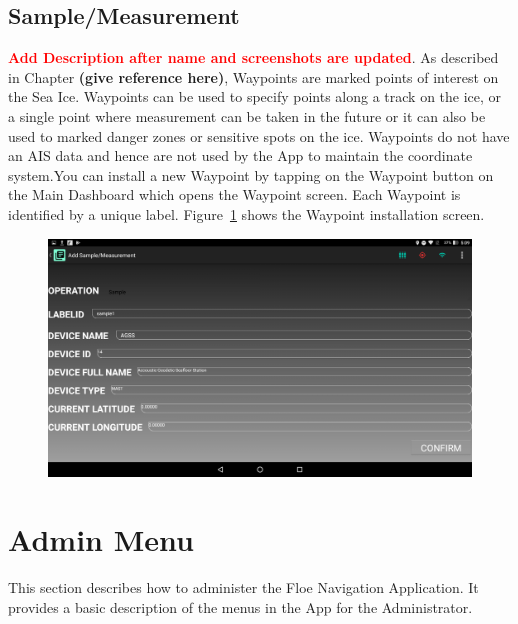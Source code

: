 \subsection{Sample/Measurement}
\label{subsec:subsec7_1_5}
\noindent
\textbf{\textcolor{red}{Add Description after name and screenshots are updated}}.
As described in Chapter \textbf{(give reference here)}, Waypoints are marked points of interest on the Sea Ice. Waypoints can be used to specify points along a track on the ice, or a single point where measurement can be taken in the future or it can also be used to marked danger zones or sensitive spots on the ice. Waypoints do not have an AIS data and hence are not used by the App to maintain the coordinate system.You can install a new Waypoint by tapping on the Waypoint button on the Main Dashboard which opens the Waypoint screen. Each Waypoint is identified by a unique label. Figure~\ref{fig:CH7Sample} shows the Waypoint installation screen.
\begin{figure}[h]
	\centering
	\includegraphics[height=0.3\textheight]{fig07/Sample.png}
	\label{fig:CH7Sample}
\end{figure}
%
\section{Admin Menu}
\label{subsec:subsec7_2}
\noindent
This section describes how to administer the Floe Navigation Application. It provides a basic description of the menus in the App for the Administrator.
 
